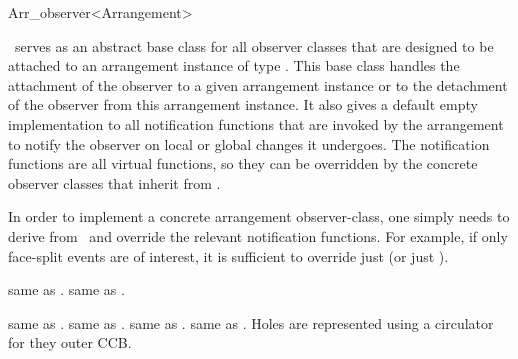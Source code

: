 
\ccRefPageBegin

\begin{ccRefClass}{Arr_observer<Arrangement>}
\label{arr_ref:arr_obs}

\ccDefinition

\ccClassTemplateName\ serves as an abstract base class for all observer
classes that are designed to be attached to an arrangement instance of
type . This base class handles the attachment of the
observer to a given arrangement instance or to the detachment of the
observer from this arrangement instance. It also gives a default empty
implementation to all notification functions that are invoked by the
arrangement to notify the observer on local or global changes it undergoes.
The notification functions are all virtual functions, so they can be
overridden by the concrete observer classes that inherit from
\ccClassTemplateName.

In order to implement a concrete arrangement observer-class, one simply
needs to derive from \ccClassTemplateName\ and override the relevant
notification functions. For example, if only face-split events are of
interest, it is sufficient to override just  
(or just ).


\ccTypes


  {same as .}
\ccGlue
{}
  {same as .}

  {same as .}
\ccGlue
{}
  {same as .}
\ccGlue
{}
  {same as .}
\ccGlue
{}
  {same as .
   Holes are represented using a circulator for they outer CCB.}

\ccCreation
{}


\end{ccRefClass}
